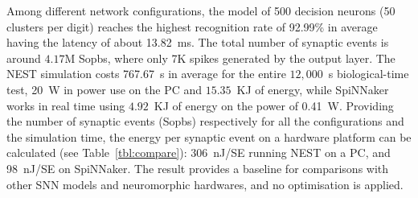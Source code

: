 \documentclass{frontiersENG} %
\begin{document}
Among different network configurations, the model of 500 decision neurons (50 clusters per digit) reaches the highest recognition rate of 92.99\% in average having the latency of about 13.82~ms.
The total number of synaptic events is around $4.17$M Sopbs, where only 7K spikes generated by the output layer. 
The NEST simulation costs 767.67~s in average for the entire $12,000$~s biological-time test, 20~W in power use on the PC and $15.35$~KJ of energy, while SpiNNaker works in real time using $4.92$~KJ of energy on the power of 0.41~W.
Providing the number of synaptic events (Sopbs) respectively for all the configurations and the simulation time, the energy per synaptic event on a hardware platform can be calculated (see Table~\ref{tbl:compare}): 
306~nJ/SE running NEST on a PC, and 98~nJ/SE on SpiNNaker.
The result provides a baseline for comparisons with other SNN models and neuromorphic hardwares, and no optimisation is applied.
\end{document}
